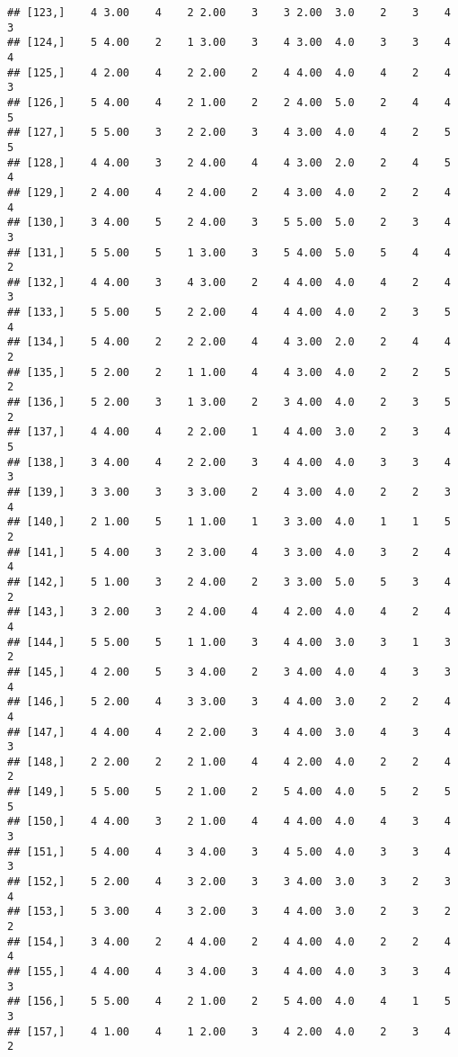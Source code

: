 \documentclass[]{article}
\begin{document}
\begin{verbatim}
## [123,]    4 3.00    4    2 2.00    3    3 2.00  3.0    2    3    4    3
## [124,]    5 4.00    2    1 3.00    3    4 3.00  4.0    3    3    4    4
## [125,]    4 2.00    4    2 2.00    2    4 4.00  4.0    4    2    4    3
## [126,]    5 4.00    4    2 1.00    2    2 4.00  5.0    2    4    4    5
## [127,]    5 5.00    3    2 2.00    3    4 3.00  4.0    4    2    5    5
## [128,]    4 4.00    3    2 4.00    4    4 3.00  2.0    2    4    5    4
## [129,]    2 4.00    4    2 4.00    2    4 3.00  4.0    2    2    4    4
## [130,]    3 4.00    5    2 4.00    3    5 5.00  5.0    2    3    4    3
## [131,]    5 5.00    5    1 3.00    3    5 4.00  5.0    5    4    4    2
## [132,]    4 4.00    3    4 3.00    2    4 4.00  4.0    4    2    4    3
## [133,]    5 5.00    5    2 2.00    4    4 4.00  4.0    2    3    5    4
## [134,]    5 4.00    2    2 2.00    4    4 3.00  2.0    2    4    4    2
## [135,]    5 2.00    2    1 1.00    4    4 3.00  4.0    2    2    5    2
## [136,]    5 2.00    3    1 3.00    2    3 4.00  4.0    2    3    5    2
## [137,]    4 4.00    4    2 2.00    1    4 4.00  3.0    2    3    4    5
## [138,]    3 4.00    4    2 2.00    3    4 4.00  4.0    3    3    4    3
## [139,]    3 3.00    3    3 3.00    2    4 3.00  4.0    2    2    3    4
## [140,]    2 1.00    5    1 1.00    1    3 3.00  4.0    1    1    5    2
## [141,]    5 4.00    3    2 3.00    4    3 3.00  4.0    3    2    4    4
## [142,]    5 1.00    3    2 4.00    2    3 3.00  5.0    5    3    4    2
## [143,]    3 2.00    3    2 4.00    4    4 2.00  4.0    4    2    4    4
## [144,]    5 5.00    5    1 1.00    3    4 4.00  3.0    3    1    3    2
## [145,]    4 2.00    5    3 4.00    2    3 4.00  4.0    4    3    3    4
## [146,]    5 2.00    4    3 3.00    3    4 4.00  3.0    2    2    4    4
## [147,]    4 4.00    4    2 2.00    3    4 4.00  3.0    4    3    4    3
## [148,]    2 2.00    2    2 1.00    4    4 2.00  4.0    2    2    4    2
## [149,]    5 5.00    5    2 1.00    2    5 4.00  4.0    5    2    5    5
## [150,]    4 4.00    3    2 1.00    4    4 4.00  4.0    4    3    4    3
## [151,]    5 4.00    4    3 4.00    3    4 5.00  4.0    3    3    4    3
## [152,]    5 2.00    4    3 2.00    3    3 4.00  3.0    3    2    3    4
## [153,]    5 3.00    4    3 2.00    3    4 4.00  3.0    2    3    2    2
## [154,]    3 4.00    2    4 4.00    2    4 4.00  4.0    2    2    4    4
## [155,]    4 4.00    4    3 4.00    3    4 4.00  4.0    3    3    4    3
## [156,]    5 5.00    4    2 1.00    2    5 4.00  4.0    4    1    5    3
## [157,]    4 1.00    4    1 2.00    3    4 2.00  4.0    2    3    4    2

\end{verbatim}
\end{document}
